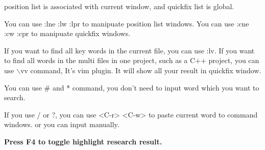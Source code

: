 \documentclass[paper=8.5in:11in, twoside, 12pt, pagesize=pdftex]{book}
\begin{document}
			position list is associated with current window, and quickfix list is global.
			
			You can use :lne :lw :lpr to manipuate position list windows. You can use :cne :cw :cpr to manipuate quickfix windows. 
			
			If you want to find all key words in the current file, you can use :lv. If you want to find all words in the multi files in one project, such as a C++ project, you can use $\backslash$vv command, It's vim plugin. It will show all your result in quickfix window. 
			
			You can use \# and * command, you don't need to input word which you want to search. 
			
			If you use / or ?, you can use <C-r> <C-w> to paste current word to command windows. or you can input manually. 
			
			\textbf{Press F4 to toggle highlight research result.} 
				
\end{document}
